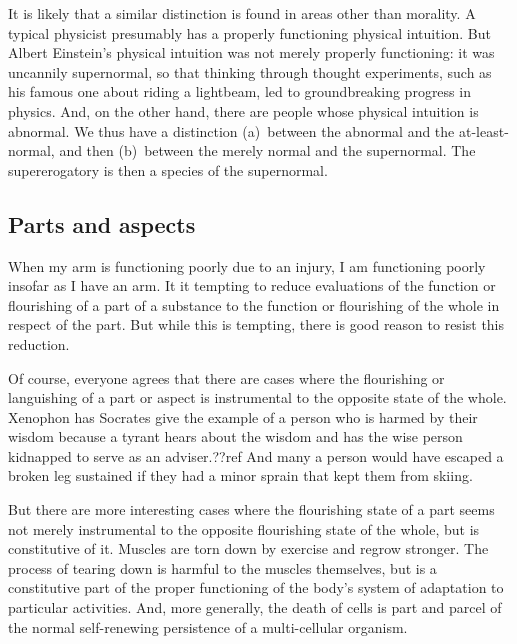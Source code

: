 It is likely that a similar distinction is found in areas other than morality. A typical
physicist presumably has a properly functioning physical intuition. But Albert Einstein's physical 
intuition was not merely properly functioning: it was uncannily supernormal, so that thinking through
thought experiments, such as his famous one about riding a lightbeam, led to groundbreaking
progress in physics. And, on the other hand, there are people whose physical intuition is
abnormal. We thus have a distinction (a)~between the abnormal and the at-least-normal, and then
(b)~between the merely normal and the supernormal. The supererogatory is then a species of the
supernormal.

\subsection{Parts and aspects}
When my arm is functioning poorly due to an injury, I am functioning poorly insofar
as I have an arm. It it tempting to reduce evaluations of the function or flourishing
of a part of a substance to the function or flourishing of the whole in respect of the
part. But while this is tempting, there is good reason to resist this reduction.

Of course, everyone agrees that there are cases where the flourishing or languishing of a part or aspect is
instrumental to the opposite state of the whole. Xenophon has Socrates give the example of a 
person who is harmed by their wisdom because a tyrant hears about the wisdom and has the
wise person kidnapped to serve as an adviser.??ref And many a person would have escaped a broken
leg sustained if they had a minor sprain that kept them from skiing. 

But there are more interesting cases where the flourishing state of a part seems not merely instrumental to 
the opposite flourishing state of the whole, but is constitutive of it. Muscles are torn down by exercise
and regrow stronger. The process of tearing down is harmful to the muscles themselves, but is a constitutive 
part of the proper functioning of the body's system of adaptation to particular activities. And, more
generally, the death of cells is part and parcel of the normal self-renewing persistence of a multi-cellular
organism.

